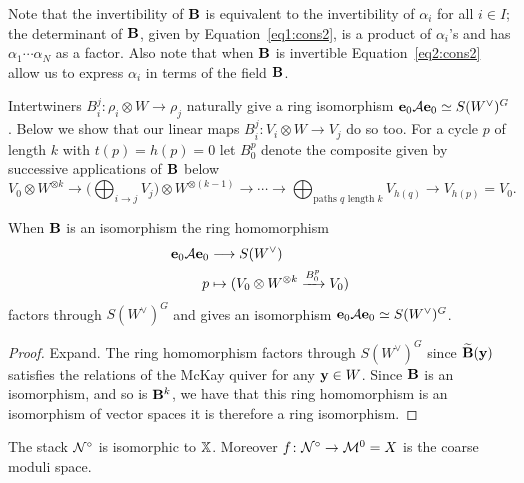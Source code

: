\documentclass{amsart}
\theoremstyle{definition}
\begin{document}
Note that the invertibility of $\mathbf{B}$ is equivalent to the invertibility of $\alpha_i$ for all $i \in I$; the determinant of $\mathbf{B}$, given by Equation~\ref{eq1:cons2}, is a product of $\alpha_i$'s and has $\alpha_1 \cdots \alpha_N$ as a factor.
Also note that when $\mathbf{B}$ is invertible Equation~\ref{eq2:cons2} allow us to express $\alpha_i$ in terms of the field $\mathbf{B}$.

Intertwiners $B_i^j \colon \rho_i \otimes W \rightarrow \rho_j$ naturally give a ring isomorphism $\mathbf{e}_0 \mathcal{A} \mathbf{e}_0 \simeq S(W^\vee)^G$.
Below we show that our linear maps $B_i^j \colon V_i \otimes W \rightarrow V_j$ do so too.
For a cycle $p$ of length $k$ with $t(p)=h(p)=0$ let $B_0^p$ denote the composite given by successive applications of $\mathbf{B}$ below $$V_0 \otimes W^{\otimes k} \longrightarrow \Bigg(\bigoplus_{i \rightarrow j} V_j\Bigg) \otimes W^{\otimes (k-1)} \rightarrow \cdots \rightarrow \bigoplus_{\text{paths } q \text{ length } k} V_{h(q)} \rightarrow V_{h(p)}=V_0.$$

\begin{lemma}\label{lem:e0Ae0}
When $\mathbf{B}$ is an isomorphism the ring homomorphism 
\begin{align*}
\mathbf{e}_0 \mathcal{A} \mathbf{e}_0 &\longrightarrow S(W^\vee)
\\ p &\mapsto (V_0 \otimes W^{\otimes k} \xrightarrow{B_0^p} V_0)
\end{align*}
factors through $S(W^\vee)^G$ and gives an isomorphism $\mathbf{e}_0 \mathcal{A} \mathbf{e}_0 \simeq S(W^\vee)^G$.
\end{lemma}

\begin{proof}
{\red Expand.}
The ring homomorphism factors through $S(W^\vee)^G$ since $\widetilde{\mathbf{B}}(\mathbf{y})$ satisfies the relations of the McKay quiver for any $\mathbf{y} \in W$.
Since $\mathbf{B}$ is an isomorphism, and so is $\mathbf{B}^k$, we have that this ring homomorphism is an isomorphism of vector spaces it is therefore a ring isomorphism.
\end{proof}

\begin{theorem}\label{thm:tannaka}
The stack ${\mathcal{N}}^\circ$ is isomorphic to $\mathbb{X}$.
Moreover $f \colon {\ensuremath{\mathcal{N}}}^\circ \rightarrow \mathcal{M}^0 = X$ is the coarse moduli space.
\end{theorem}
\end{document}
